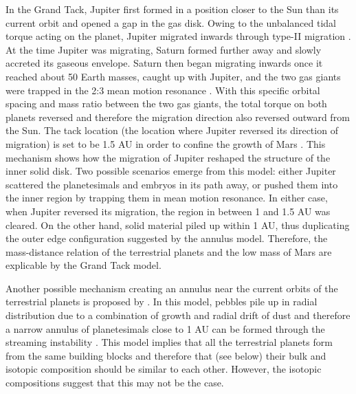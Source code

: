 \documentclass{aa}
\begin{document}
In the Grand Tack, Jupiter first formed in a position closer to the Sun than its current orbit and opened a gap in the gas disk. Owing to the unbalanced tidal torque acting on the planet, Jupiter migrated inwards through type-II migration \citep{lin1986tidal}. At the time Jupiter was migrating, Saturn formed further away and slowly accreted its gaseous envelope. Saturn then began migrating inwards once it reached about 50 Earth masses, caught up with Jupiter, and the two gas giants were trapped in the 2:3 mean motion resonance \citep{masset2001reversing}. With this specific orbital spacing and mass ratio between the two gas giants, the total torque on both planets reversed and therefore the migration direction also reversed outward from the Sun. The tack location (the location where Jupiter reversed its direction of migration) is set to be 1.5 AU in order to confine the growth of Mars \citep{walsh2011low}. This mechanism shows how the migration of Jupiter reshaped the structure of the inner solid disk. Two possible scenarios emerge from this model: either Jupiter scattered the planetesimals and embryos in its path away, or pushed them into the inner region by trapping them in mean motion resonance. In either case, when Jupiter reversed its migration, the region in between 1 and 1.5 AU was cleared. On the other hand, solid material piled up within 1 AU, thus duplicating the outer edge configuration suggested by the annulus model. Therefore, the mass-distance relation of the terrestrial planets and the low mass of Mars are explicable by the Grand Tack model. 

Another possible mechanism creating an annulus near the current orbits of the terrestrial planets is proposed by \cite{drkazkowska2016close}. In this model, pebbles pile up in radial distribution due to a combination of growth and radial drift of dust and therefore a narrow annulus of planetesimals close to 1 AU can be formed through the streaming instability \citep{johansen2007rapid,ida2016formation}. This model implies that all the terrestrial planets form from the same building blocks and therefore that (see below) their bulk and isotopic composition should be similar to each other. However, the isotopic compositions suggest that this may not be the case.   
\end{document}
